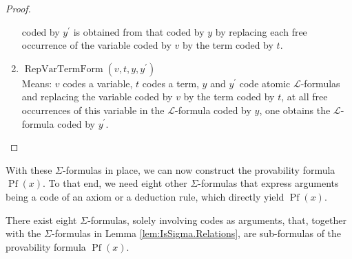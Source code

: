\begin{proof}
\begin{enumerate}
        coded by $y^\prime$ is obtained from that coded by $y$ by replacing each free occurrence of 
        the variable coded by $v$ by the term coded by $t$.
        \item $\operatorname{RepVarTermForm}(v, t, y, y^\prime)$\\
        Means: $v$ codes a variable, $t$ codes a term, $y$ and $y^\prime$ code atomic 
        $\mathcal{L}$-formulas and replacing the variable coded by $v$ by the term coded by $t$, 
        at all free occurrences of this variable in the $\mathcal{L}$-formula coded by $y$, 
        one obtains the $\mathcal{L}$-formula coded by $y^\prime$.
    \end{enumerate}
\end{proof}

With these $\Sigma$-formulas in place, 
we can now construct the provability formula $\operatorname{Pf}(x)$.
To that end, we need eight other $\Sigma$-formulas that express arguments being 
a code of an axiom or a deduction rule, which directly yield $\operatorname{Pf}(x)$.

\begin{lemma}
    \label{lem:IsSigma.Ax+...+IsSigma.Pf}
    There exist eight $\Sigma$-formulas, solely involving codes as arguments, that, together with
    the $\Sigma$-formulas in Lemma \ref{lem:IsSigma.Relations}, are sub-formulas of
    the provability formula $\operatorname{Pf}(x)$.
\end{lemma}

